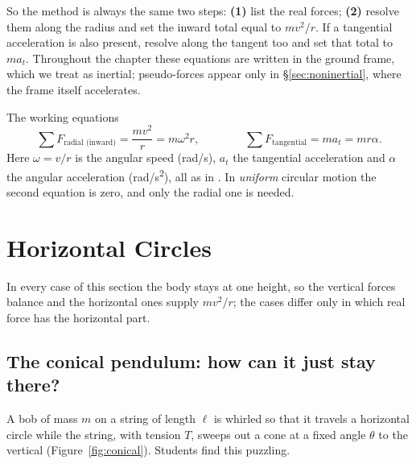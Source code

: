 So the method is always the same two steps: \textbf{(1)} list the real forces; \textbf{(2)} resolve them
along the radius and set the inward total equal to $mv^{2}/r$. If a tangential acceleration is also
present, resolve along the tangent too and set that total to $ma_t$. Throughout the chapter these
equations are written in the ground frame, which we treat as inertial; pseudo-forces appear only in
\S\ref{sec:noninertial}, where the frame itself accelerates.

\begin{methodbox}{The working equations}
\[
\sum F_{\text{radial (inward)}}=\frac{mv^{2}}{r}=m\omega^{2}r,
\qquad\qquad
\sum F_{\text{tangential}}=ma_t=mr\alpha.
\]
Here $\omega=v/r$ is the angular speed (\si{rad/s}), $a_t$ the tangential acceleration and $\alpha$ the
angular acceleration (\si{rad/s^2}), all as in . In \emph{uniform} circular motion the
second equation is zero, and only the radial one is needed.
\end{methodbox}

\section{Horizontal Circles}
In every case of this section the body stays at one height, so the vertical forces balance and the
horizontal ones supply $mv^{2}/r$; the cases differ only in which real force has the horizontal part.

\subsection{The conical pendulum: how can it just stay there?}

A bob of mass $m$ on a string of length $\ell$ is whirled so that it travels a horizontal circle while the
string, with tension $T$, sweeps out a cone at a fixed angle $\theta$ to the vertical (Figure~\ref{fig:conical}). Students find this puzzling.

